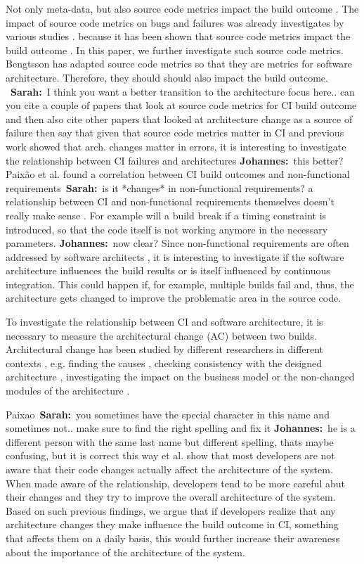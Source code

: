 \documentclass[sigplan, anonymous, review]{acmart}
\newcommand{\sn}[1]{{\color{blue}\textbf{Sarah:}~#1}}
\newcommand{\jk}[1]{{\color{violet}\textbf{Johannes:}~#1}}
\begin{document}
Not only meta-data, but also source code metrics impact the build outcome \cite{FailsCorr}. The impact of source code metrics on bugs and failures was already investigates by various studies \cite{MetricsSource1, MetricsSource2}. 
because it has been shown that source code metrics impact the build outcome \cite{FailsCorr}. 
In this paper, we further investigate such source code metrics. 
Bengtsson \cite{arc-metrics} has adapted source code metrics so that they are metrics for software architecture. Therefore, they should should also impact the build outcome. 
~\sn{I think you want a better transition to the architecture focus here.. can you cite a couple of papers that look at source code metrics for CI build outcome and then also cite other papers that looked at architecture change as a source of failure then say that given that source code metrics matter in CI and previous work showed that arch. changes matter in errors, it is interesting to investigate the relationship between CI failures and architectures} \jk{this better?}
Paix\~{a}o et al. found a correlation between CI build outcomes and non-functional requirements~\sn{is it *changes* in non-functional requirements? a relationship between CI and non-functional requirements themselves doesn't really make sense} \cite{Fail-NFReq}.
For example will a build break if a timing constraint is introduced, so that the code itself is not working anymore in the necessary parameters.
\jk{now clear?}
Since non-functional requirements are often addressed by software architects \cite{NFR-Architects}, it is interesting to investigate if the software architecture influences the build results or is itself influenced by continuous integration. 
This could happen if, for example, multiple builds fail and, thus, the architecture gets changed to improve the problematic area in the source code.

To investigate the relationship between CI and software architecture, it is necessary to measure the architectural change (AC) between two builds. Architectural change has been studied by different researchers in different contexts \cite{Aramis,StructDist,Arc-MDSE,Arcade-Base} , e.g.  finding the causes \cite{AC-Causes}, checking consistency with the designed architecture \cite{ArcConf, ArcCons}, investigating the impact on the business model \cite{ArcChange-Business} or the non-changed modules of the architecture \cite{Knowledge-AC}. 

Paixao~\sn{you sometimes have the special character in this name and sometimes not.. make sure to find the right spelling and fix it} \jk{he is a different person with the same last name but different spelling, thats maybe confusing, but it is correct this way} et al. \cite{ImpactAwareness} show that most developers are not aware that their code changes actually affect the architecture of the system. When made aware of the relationship, developers tend to be more careful abut their changes and they try to improve the overall architecture of the system.
Based on such previous findings, we argue that if developers realize that any architecture changes they make influence the build outcome in CI, something that affects them on a daily basis, this would further increase their awareness about the importance of the architecture of the system.
\end{document}
